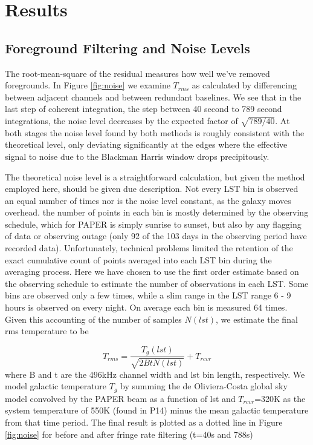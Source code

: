 \documentclass[preprint]{aastex}
\begin{document}
\section{Results}
\label{sec:results}
\subsection{Foreground Filtering and Noise Levels}
\label{sec:noise}
The root-mean-square of the residual measures how well we've removed foregrounds.  In Figure \ref{fig:noise} we examine $T_{rms}$ as calculated by differencing between adjacent channels and between redundant baselines. We see that in the last step of coherent integration, the step between 40 second to 789 second integrations, the noise level decreases by the expected factor of $\sqrt{789/40}$.  At both stages the noise level found by both methods is roughly consistent with the theoretical level, only deviating significantly at the edges where the effective signal to noise due to the Blackman Harris window drops precipitously. 

The theoretical noise level is a straightforward calculation, but given the method employed here, should be given due description.
Not every LST bin is observed an equal number of times nor is the noise level constant, as the galaxy moves overhead.  the number of points in each bin is mostly determined by the observing schedule, which for PAPER is simply sunrise to sunset, but also by any flagging of data or observing outage (only 92 of the 103 days in the observing period have recorded data).  Unfortunately, technical problems limited the retention of the exact cumulative count of points averaged into each LST bin during the averaging process.  Here we have chosen to use the first order estimate based on the observing schedule to estimate the number of observations in each LST. Some bins are observed only a few times, while a slim range in the LST range 6 - 9 hours is observed on every night. On average each bin is measured 64 times. Given this accounting of the number of samples $N(lst)$, we estimate the final rms temperature to be

\[
T_{rms}  = \frac{T_{g}(lst)}{\sqrt{2BtN(lst)}} + T_{rcvr}
\]
where B and t are the 496kHz channel width and lst bin length, respectively. We model galactic temperature $T_g$ by summing the de Oliviera-Costa global sky model \citep{deOliveiraCosta:2008p2242} convolved by the PAPER beam as a function of lst and $T_{rcvr}$=320K as the system temperature of 550K (found in P14) minus the mean galactic temperature from that time period. The final result is plotted as a dotted line in Figure \ref{fig:noise} for before and after fringe rate filtering (t=40s and 788s)%
\end{document}
